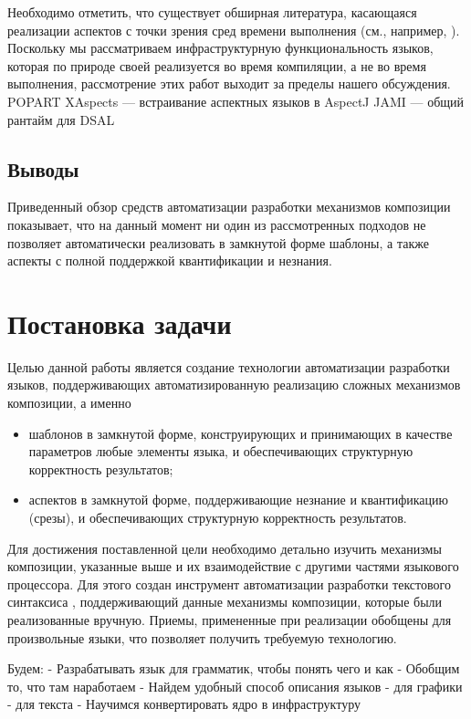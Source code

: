 Необходимо отметить, что существует обширная литература, касающаяся реализации аспектов с точки зрения сред времени выполнения (см., например, \cite{JAMI}). Поскольку мы рассматриваем инфраструктурную функциональность языков, которая по природе своей реализуется во время компиляции, а не во время выполнения, рассмотрение этих работ выходит за пределы нашего обсуждения.
	POPART
	XAspects --- встраивание аспектных языков в AspectJ	
	JAMI --- общий рантайм для DSAL
	
\section{Выводы}

Приведенный обзор средств автоматизации разработки механизмов композиции показывает, что на данный момент ни один из рассмотренных подходов не позволяет автоматически реализовать в замкнутой форме шаблоны, а также аспекты с полной поддержкой квантификации и незнания.

\chapter{Постановка задачи}

Целью данной работы является создание технологии автоматизации разработки языков, поддерживающих автоматизированную реализацию сложных механизмов композиции, а именно
\begin{itemize}
\item шаблонов в замкнутой форме, конструирующих и принимающих в качестве параметров любые элементы языка, и обеспечивающих структурную корректность результатов;
\item аспектов в замкнутой форме, поддерживающие незнание и квантификацию (срезы), и обеспечивающих структурную корректность результатов.
\end{itemize}

Для достижения поставленной цели необходимо детально изучить механизмы композиции, указанные выше и их взаимодействие с другими частями языкового процессора. Для этого создан инструмент автоматизации разработки текстового синтаксиса , поддерживающий данные механизмы композиции, которые были реализованные вручную. Приемы, примененные при реализации  обобщены для произвольные языки, что позволяет получить требуемую технологию.

Будем:
	- Разрабатывать язык для грамматик, чтобы понять чего и как
	- Обобщим то, что там наработаем
	- Найдем удобный способ описания языков
		- для графики
		- для текста
	- Научимся конвертировать ядро в инфраструктуру